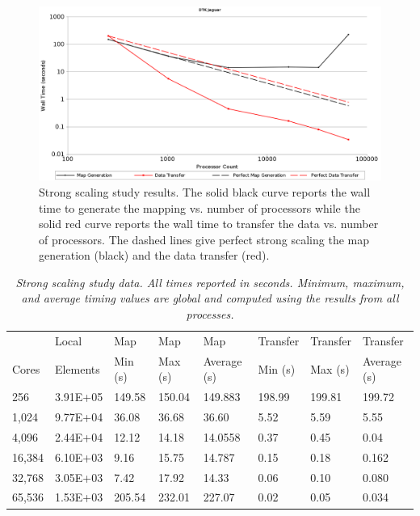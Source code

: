 \documentclass{mc2013}
\begin{document}
\begin{figure}[htpb!]
  \centering \includegraphics[width=5.5in]{StrongScaling.png}
  \caption{Strong scaling study results. The solid black curve reports
    the wall time to generate the mapping vs. number of processors
    while the solid red curve reports the wall time to transfer the
    data vs. number of processors. The dashed lines give perfect
    strong scaling the map generation (black) and the data transfer
    (red).}
  \label{fig:strong_scaling}
\end{figure}

\begin{table}[htpb!]
  \begin{center}
    \begin{tabular}{llllllll}\hline\hline
      \multicolumn{1}{l}{}& \multicolumn{1}{l}{Local} &
      \multicolumn{1}{l}{Map} & \multicolumn{1}{l}{Map} &
      \multicolumn{1}{l}{Map} & \multicolumn{1}{l}{Transfer} &
      \multicolumn{1}{l}{Transfer} &
      \multicolumn{1}{l}{Transfer}\\ \multicolumn{1}{l}{Cores} &
      \multicolumn{1}{l}{Elements} & \multicolumn{1}{l}{Min (s)} &
      \multicolumn{1}{l}{Max (s)} & \multicolumn{1}{l}{Average (s)} &
      \multicolumn{1}{l}{Min (s)} & \multicolumn{1}{l}{Max (s)} &
      \multicolumn{1}{l}{Average (s)}\\ \hline\hline %
      256 & 3.91E+05
      & 149.58& 150.04 & 149.883 & 198.99 & 199.81 & 199.72 \\ 1,024 &
      9.77E+04 & 36.08 & 36.68 & 36.60 & 5.52 & 5.59 & 5.55 \\ 4,096 &
      2.44E+04 & 12.12 & 14.18 & 14.0558 & 0.37 & 0.45 & 0.04
      \\ 16,384 & 6.10E+03 & 9.16 & 15.75 & 14.787 & 0.15 & 0.18 &
      0.162 \\ 32,768 & 3.05E+03 & 7.42 & 17.92 & 14.33 & 0.06 & 0.10
      & 0.080 \\ 65,536 & 1.53E+03 & 205.54 & 232.01 & 227.07 & 0.02 &
      0.05 & 0.034 \\ \hline\hline
    \end{tabular}
  \end{center}
  \caption{\sl Strong scaling study data. All times reported in
    seconds. Minimum, maximum, and average timing values are global
    and computed using the results from all processes.}
  \label{tab:strong_scaling}
\end{table}
\end{document}
